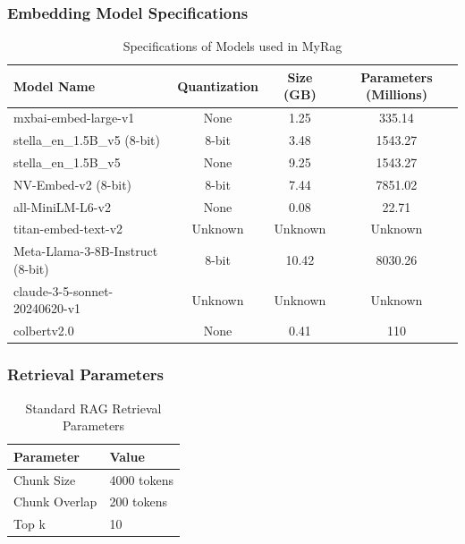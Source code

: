 \documentclass{scrartcl}
\begin{document}
\subsubsection{Embedding Model Specifications}

\begin{table}[H]
\centering
\begin{tabular}{|l|c|c|c|}
\hline
\textbf{Model Name} & \textbf{Quantization} & \textbf{Size (GB)} & \textbf{Parameters (Millions)} \\ \hline
mxbai-embed-large-v1 & None              & 1.25 & 335.14 \\ \hline
stella\_en\_1.5B\_v5 (8-bit) & 8-bit          & 3.48 & 1543.27 \\ \hline
stella\_en\_1.5B\_v5         & None           & 9.25 & 1543.27 \\ \hline
NV-Embed-v2 (8-bit)            & 8-bit          & 7.44 & 7851.02 \\ \hline
all-MiniLM-L6-v2 & None          & 0.08 & 22.71 \\ \hline
titan-embed-text-v2                   & Unknown        & Unknown & Unknown \\ \hline
Meta-Llama-3-8B-Instruct (8-bit) & 8-bit   & 10.42 & 8030.26 \\ \hline
claude-3-5-sonnet-20240620-v1      & Unknown           & Unknown & Unknown \\ \hline
colbertv2.0       & None                  & 0.41 & 110               \\ \hline
\end{tabular}
\caption{Specifications of Models used in MyRag}
\label{table:models_specification}
\end{table}


\subsubsection{Retrieval Parameters}

\begin{table}[H]
\centering
\begin{tabular}{|l|l|}
\hline
\textbf{Parameter} & \textbf{Value} \\
\hline
Chunk Size & 4000 tokens \\
Chunk Overlap & 200 tokens \\
Top k & 10 \\
\hline
\end{tabular}
\caption{Standard RAG Retrieval Parameters}
\label{table:retrieval_params}
\end{table}
\end{document}
